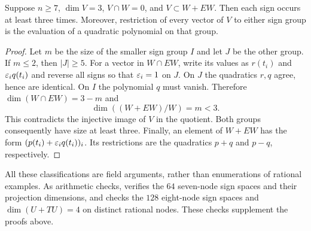 \begin{lemma}\label{lem:sign-groups}
Suppose $n\ge7$, $\dim V=3$, $V\cap W=0$, and
$V\subset W+EW$. Then each sign occurs at least three times.
Moreover, restriction of every vector of $V$ to either sign group
is the evaluation of a quadratic polynomial on that group.
\end{lemma}
\begin{proof}
Let $m$ be the size of the smaller sign group $I$ and let $J$ be
the other group. If $m\le2$, then $|J|\ge5$.
For a vector in $W\cap EW$, write its values as $r(t_i)$ and
$\varepsilon_iq(t_i)$ and reverse all signs so that $\varepsilon_i=1$ on $J$.
On $J$ the quadratics $r,q$ agree, hence are identical. On $I$
the polynomial $q$ must vanish. Therefore
$\dim(W\cap EW)=3-m$ and
\[
 \dim((W+EW)/W)=m<3.
\]
This contradicts the injective image of $V$ in the quotient.
Both groups consequently have size at least three.
Finally, an element of $W+EW$ has the form
$(p(t_i)+\varepsilon_iq(t_i))_i$. Its restrictions are the quadratics
$p+q$ and $p-q$, respectively.
\end{proof}

All these classifications are field arguments, rather than
enumerations of rational examples. As arithmetic checks,
 verifies the $64$ seven-node sign spaces
and their projection dimensions, and 
checks the $128$ eight-node sign spaces and $\dim(U+TU)=4$
on distinct rational nodes. These checks supplement the proofs
above.
